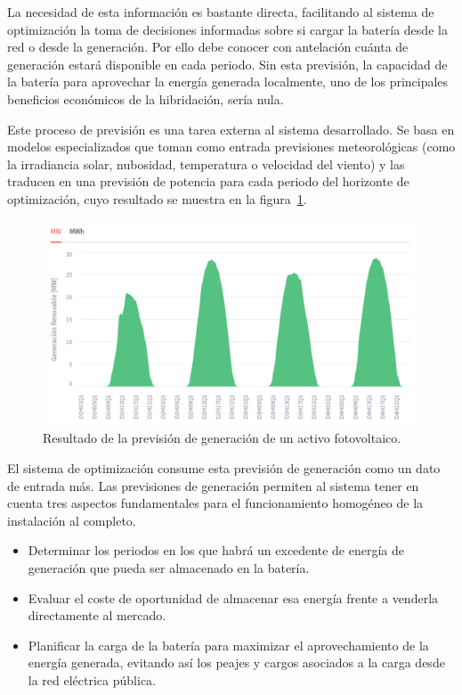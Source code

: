 La necesidad de esta información es bastante directa, facilitando al sistema de optimización la toma de decisiones informadas sobre si cargar la batería desde la red o desde la generación. Por ello debe conocer con antelación cuánta de generación estará disponible en cada periodo. Sin esta previsión, la capacidad de la batería para aprovechar la energía generada localmente, uno de los principales beneficios económicos de la hibridación, sería nula.

Este proceso de previsión es una tarea externa al sistema desarrollado. Se basa en modelos especializados que toman como entrada previsiones meteorológicas (como la irradiancia solar, nubosidad, temperatura o velocidad del viento) y las traducen en una previsión de potencia para cada periodo del horizonte de optimización, cuyo resultado se muestra en la figura~\ref{fig:prevision-generacion}.

\begin{figure}
  \centering
  \includegraphics[width=0.75\linewidth]{figures/prevision-generacion.png}
  \caption[Previsión de generación de un activo.]{Resultado de la previsión de generación de un activo fotovoltaico.}%
  \label{fig:prevision-generacion}
\end{figure}

El sistema de optimización consume esta previsión de generación como un dato de entrada más. Las previsiones de generación permiten al sistema tener en cuenta tres aspectos fundamentales para el funcionamiento homogéneo de la instalación al completo.

\begin{itemize}

  \item Determinar los periodos en los que habrá un excedente de energía de generación que pueda ser almacenado en la batería.

  \item Evaluar el coste de oportunidad de almacenar esa energía frente a venderla directamente al mercado.

  \item Planificar la carga de la batería para maximizar el aprovechamiento de la energía generada, evitando así los peajes y cargos asociados a la carga desde la red eléctrica pública.

\end{itemize}

